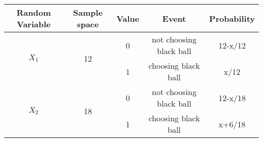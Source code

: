\begin{tabular}{|c|c|c|c|c|}
\hline
Random Variable	&Sample space	&Value	&Event	&Probability\\
\hline
\multirow{2}{*}{$X_1$}	&\multirow{2}{*}{12}	&0	&not choosing black ball	&12-x/12\\
\cline{3-5}		&	&1	&choosing black ball	&x/12\\
\hline
\multirow{2}{*}{$X_2$}	&\multirow{2}{*}{18}	&0	&not choosing black ball	&12-x/18\\
\cline{3-5}		&	&1	&choosing black ball	&x+6/18\\
\hline
\end{tabular}

